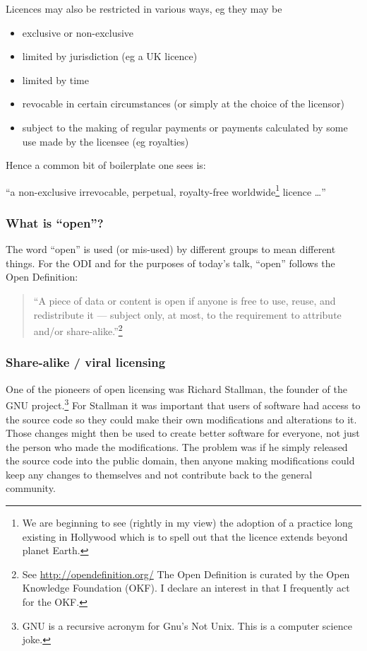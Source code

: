 Licences may also be restricted in various ways, eg they may be

\begin{itemize}
\item
  exclusive or non-exclusive
\item
  limited by jurisdiction (eg a UK licence)
\item
  limited by time
\item
  revocable in certain circumstances (or simply at the choice of the
  licensor)
\item
  subject to the making of regular payments or payments calculated by
  some use made by the licensee (eg royalties)
\end{itemize}

Hence a common bit of boilerplate one sees is:

``a non-exclusive irrevocable, perpetual, royalty-free
worldwide\footnote{We are beginning to see (rightly in my view) the
  adoption of a practice long existing in Hollywood which is to spell
  out that the licence extends beyond planet Earth.} licence \ldots{}''

\subsubsection{What is ``open''?}\label{what-is-open}

The word ``open'' is used (or mis-used) by different groups to mean
different things. For the ODI and for the purposes of today's talk,
``open'' follows the Open Definition:

\begin{quote}
``A piece of data or content is open if anyone is free to use, reuse,
and redistribute it --- subject only, at most, to the requirement to
attribute and/or share-alike.''\footnote{See
  \url{http://opendefinition.org/} The Open Definition is curated by the
  Open Knowledge Foundation (OKF). I declare an interest in that I
  frequently act for the OKF.}
\end{quote}

\subsubsection{Share-alike / viral
licensing}\label{share-alike-viral-licensing}

One of the pioneers of open licensing was Richard Stallman, the founder
of the GNU project.\footnote{GNU is a recursive acronym for Gnu's Not
  Unix. This is a computer science joke.} For Stallman it was important
that users of software had access to the source code so they could make
their own modifications and alterations to it. Those changes might then
be used to create better software for everyone, not just the person who
made the modifications. The problem was if he simply released the source
code into the public domain, then anyone making modifications could keep
any changes to themselves and not contribute back to the general
community.

